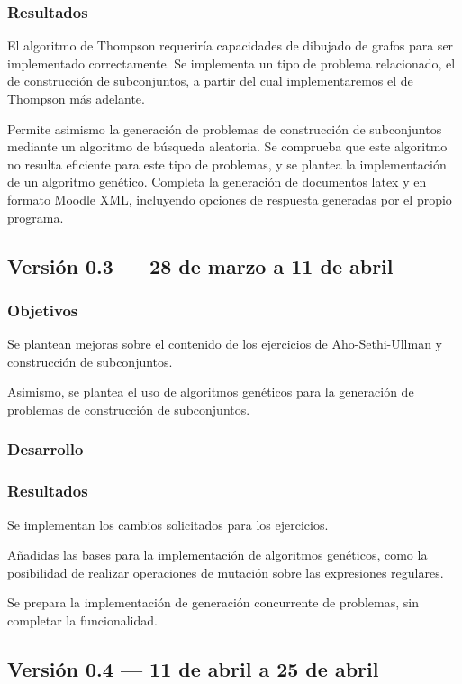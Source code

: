\subsubsection{Resultados}

El algoritmo de Thompson requeriría capacidades de dibujado de grafos para ser implementado correctamente.
Se implementa un tipo de problema relacionado, el de construcción de subconjuntos, a partir del cual implementaremos el de Thompson más adelante.

Permite asimismo la generación de problemas de construcción de subconjuntos mediante un algoritmo de búsqueda aleatoria.
Se comprueba que este algoritmo no resulta eficiente para este tipo de problemas, y se plantea la implementación de un algoritmo genético.
Completa la generación de documentos latex y en formato Moodle XML, incluyendo opciones de respuesta generadas por el propio programa.

\subsection{Versión 0.3 --- 28 de marzo a 11 de abril}

\subsubsection{Objetivos}
Se plantean mejoras sobre el contenido de los ejercicios de Aho-Sethi-Ullman y construcción de subconjuntos.

Asimismo, se plantea el uso de algoritmos genéticos para la generación de problemas de construcción de subconjuntos.

\subsubsection{Desarrollo}

\subsubsection{Resultados}
Se implementan los cambios solicitados para los ejercicios.

Añadidas las bases para la implementación de algoritmos genéticos, como la posibilidad de realizar operaciones de mutación sobre las expresiones regulares.

Se prepara la implementación de generación concurrente de problemas, sin completar la funcionalidad.

\subsection{Versión 0.4 --- 11 de abril a 25 de abril}

